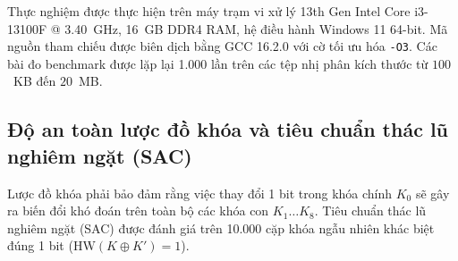\documentclass[10pt,twocolumn]{article}
\begin{document}
Thực nghiệm được thực hiện trên máy trạm vi xử lý 13th Gen Intel Core i3-13100F @ 3.40~GHz, 16~GB DDR4 RAM, hệ điều hành Windows 11 64-bit. Mã nguồn tham chiếu được biên dịch bằng GCC 16.2.0 với cờ tối ưu hóa \texttt{-O3}. Các bài đo benchmark được lặp lại 1.000 lần trên các tệp nhị phân kích thước từ $100$~KB đến $20$~MB.

\subsection{Độ an toàn lược đồ khóa và tiêu chuẩn thác lũ nghiêm ngặt (SAC)}
\label{subsec:key_schedule_sac_vi}
Lược đồ khóa phải bảo đảm rằng việc thay đổi 1 bit trong khóa chính $K_0$ sẽ gây ra biến đổi khó đoán trên toàn bộ các khóa con $K_1 \dots K_8$. Tiêu chuẩn thác lũ nghiêm ngặt (SAC) \cite{webster1985sac} được đánh giá trên 10.000 cặp khóa ngẫu nhiên khác biệt đúng 1 bit ($\text{HW}(K \oplus K') = 1$).

\begin{table}[htbp]
\caption{Tiêu chuẩn SAC của lược đồ khóa Rubik-4D (10.000 cặp khóa).}
\label{tab:key_schedule_sac_vi}
\centering
\small
{}
\end{table}
\end{document}
